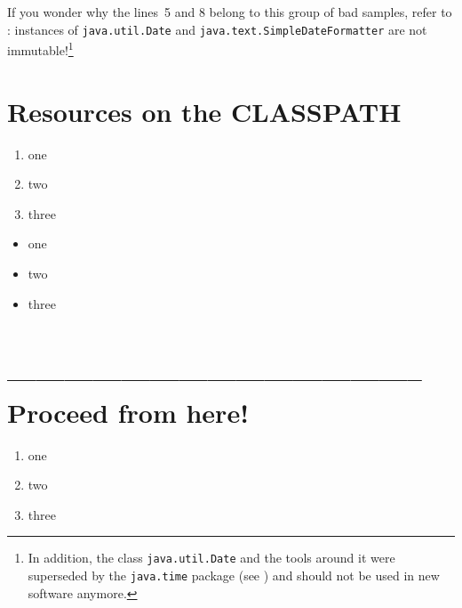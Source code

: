 If you wonder why the lines~5 and 8 belong to this group of bad samples, refer to \autocite{ORACLE_DOC_DATE_CLASS,ORACLE_DOC_SIMPLEDATEFORMATTER_CLASS}: instances of \lstinline|java.util.Date| and \lstinline|java.text.SimpleDateFormatter| are not immutable!\footnote{In addition, the class \lstinline|java.util.Date| and the tools around it were superseded by the \lstinline|java.time| package (see \autocite{ORACLE_DOC_TIME_PACKAGE}) and should not be used in new software anymore.}


\hrulefill\newpage 
\section{Resources on the CLASSPATH}\label{sec:ResourcesClasspath}
\autocite{ORACLE_DOC_CLASS:getResourceAsStream}
\autocite{ORACLE_DOC_CLASS:getResource}
\lipsum[1]

\begin{enumerate}[label=P\arabic*.]
\item{one}
\item{two}
\item{three}
\end{enumerate}

\begin{itemize}[nosep]
\item{one}
\item{two}
\item{three}
\end{itemize}

\begin{lstlisting}[numbers=left]
\end{lstlisting}

\hrulefill\newpage 
\section{-------------------------------------------- Proceed from here!}
\lipsum[1]

\begin{enumerate}[label=P\arabic*.]
\item{one}
\item{two}
\item{three}
\end{enumerate}

